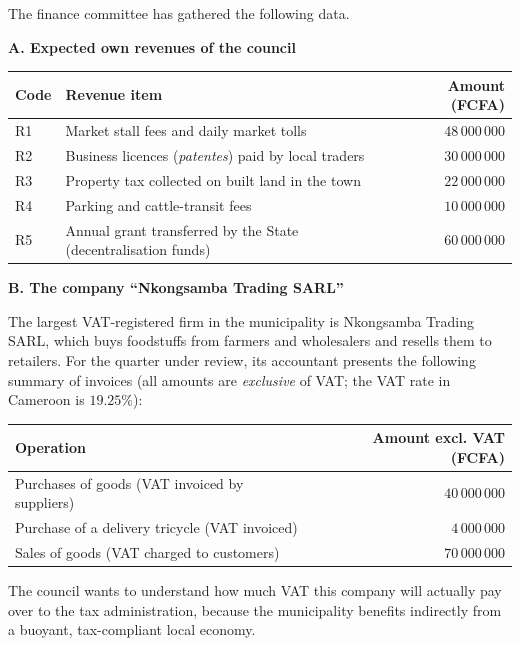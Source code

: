 \documentclass[11pt]{article}
\begin{document}
The finance committee has gathered the following data.

\textbf{A. Expected own revenues of the council}

\begin{center}
\begin{tabularx}{\linewidth}{|l|X|r|}
\hline
\rowcolor{popblueL} \textbf{Code} & \textbf{Revenue item} & \textbf{Amount (FCFA)} \\
\hline
R1 & Market stall fees and daily market tolls & $48\,000\,000$ \\
\hline
R2 & Business licences (\emph{patentes}) paid by local traders & $30\,000\,000$ \\
\hline
R3 & Property tax collected on built land in the town & $22\,000\,000$ \\
\hline
R4 & Parking and cattle-transit fees & $10\,000\,000$ \\
\hline
R5 & Annual grant transferred by the State (decentralisation funds) & $60\,000\,000$ \\
\hline
\end{tabularx}
\end{center}

\textbf{B. The company ``Nkongsamba Trading SARL''}

The largest VAT-registered firm in the municipality is Nkongsamba Trading SARL, which buys foodstuffs from farmers and wholesalers and resells them to retailers. For the quarter under review, its accountant presents the following summary of invoices (all amounts are \emph{exclusive} of VAT; the VAT rate in Cameroon is $19.25\%$):

\begin{center}
\begin{tabularx}{\linewidth}{|X|r|}
\hline
\rowcolor{popblueL} \textbf{Operation} & \textbf{Amount excl. VAT (FCFA)} \\
\hline
Purchases of goods (VAT invoiced by suppliers) & $40\,000\,000$ \\
\hline
Purchase of a delivery tricycle (VAT invoiced) & $4\,000\,000$ \\
\hline
Sales of goods (VAT charged to customers) & $70\,000\,000$ \\
\hline
\end{tabularx}
\end{center}

The council wants to understand how much VAT this company will actually pay over to the tax administration, because the municipality benefits indirectly from a buoyant, tax-compliant local economy.
\end{document}
